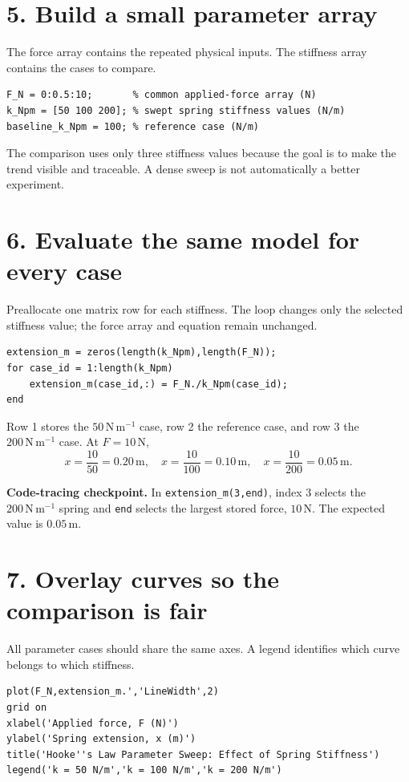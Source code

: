 \documentclass[11pt,a4paper]{article}
\newcommand{\units}[1]{\,\mathrm{#1}}
\begin{document}
\section*{5. Build a small parameter array}
The force array contains the repeated physical inputs. The stiffness array contains the cases to compare.
\begin{lstlisting}[style=matlabstyle,caption={Define the common force array, swept stiffness values, and reference case.}]
F_N = 0:0.5:10;       % common applied-force array (N)
k_Npm = [50 100 200]; % swept spring stiffness values (N/m)
baseline_k_Npm = 100; % reference case (N/m)
\end{lstlisting}
The comparison uses only three stiffness values because the goal is to make the trend visible and traceable. A dense sweep is not automatically a better experiment.

\section*{6. Evaluate the same model for every case}
Preallocate one matrix row for each stiffness. The loop changes only the selected stiffness value; the force array and equation remain unchanged.
\begin{lstlisting}[style=matlabstyle,caption={Evaluate extension for each stiffness using the common force array.}]
extension_m = zeros(length(k_Npm),length(F_N));
for case_id = 1:length(k_Npm)
    extension_m(case_id,:) = F_N./k_Npm(case_id);
end
\end{lstlisting}
Row 1 stores the $50\units{N\,m^{-1}}$ case, row 2 the reference case, and row 3 the $200\units{N\,m^{-1}}$ case. At $F=10\units{N}$,
\[
x=\frac{10}{50}=0.20\units{m},\quad
x=\frac{10}{100}=0.10\units{m},\quad
x=\frac{10}{200}=0.05\units{m}.
\]

\begin{checkbox}\textbf{Code-tracing checkpoint.} In \texttt{extension\_m(3,end)}, index 3 selects the $200\units{N\,m^{-1}}$ spring and \texttt{end} selects the largest stored force, $10\units{N}$. The expected value is $0.05\units{m}$.\end{checkbox}

\section*{7. Overlay curves so the comparison is fair}
All parameter cases should share the same axes. A legend identifies which curve belongs to which stiffness.
\begin{lstlisting}[style=matlabstyle,caption={Plot all stiffness cases on common applied-force and extension axes.}]
plot(F_N,extension_m.','LineWidth',2)
grid on
xlabel('Applied force, F (N)')
ylabel('Spring extension, x (m)')
title('Hooke''s Law Parameter Sweep: Effect of Spring Stiffness')
legend('k = 50 N/m','k = 100 N/m','k = 200 N/m')
\end{lstlisting}
\end{document}
